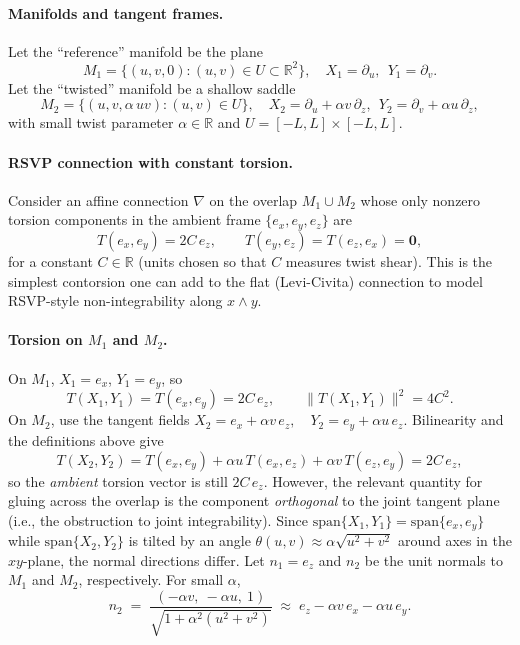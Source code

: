 \documentclass[a4paper,11pt]{article}
\begin{document}
\paragraph{Manifolds and tangent frames.}
Let the ``reference'' manifold be the plane
\[
M_1=\{(u,v,0): (u,v)\in U\subset\mathbb{R}^2\},\quad
X_1=\partial_u,\ \ Y_1=\partial_v.
\]
Let the ``twisted'' manifold be a shallow saddle
\[
M_2=\{(u,v,\alpha\,uv): (u,v)\in U\},\quad
X_2=\partial_u+\alpha v\,\partial_z,\ \ Y_2=\partial_v+\alpha u\,\partial_z,
\]
with small twist parameter $\alpha\in\mathbb{R}$ and $U=[-L,L]\times[-L,L]$.

\paragraph{RSVP connection with constant torsion.}
Consider an affine connection $\nabla$ on the overlap $M_1\cup M_2$ whose only
nonzero torsion components in the ambient frame $\{e_x,e_y,e_z\}$ are
\[
T(e_x,e_y)=2C\,e_z,\qquad T(e_y,e_z)=T(e_z,e_x)=\mathbf{0},
\]
for a constant $C\in\mathbb{R}$ (units chosen so that $C$ measures twist
shear). This is the simplest contorsion one can add to the flat (Levi-Civita)
connection to model RSVP-style non-integrability along $x\wedge y$.

\paragraph{Torsion on $M_1$ and $M_2$.}
On $M_1$, $X_1=e_x$, $Y_1=e_y$, so
\[
T(X_1,Y_1)=T(e_x,e_y)=2C\,e_z,\qquad \|T(X_1,Y_1)\|^2=4C^2.
\]
On $M_2$, use the tangent fields
\(
X_2=e_x+\alpha v\,e_z,\quad Y_2=e_y+\alpha u\,e_z.
\)
Bilinearity and the definitions above give
\[
T(X_2,Y_2)=T(e_x,e_y)+\alpha u\,T(e_x,e_z)+\alpha v\,T(e_z,e_y)
=2C\,e_z,
\]
so the \emph{ambient} torsion vector is still $2C\,e_z$. However, the relevant
quantity for gluing across the overlap is the component \emph{orthogonal} to
the joint tangent plane (i.e., the obstruction to joint integrability). Since
$\mathrm{span}\{X_1,Y_1\}=\mathrm{span}\{e_x,e_y\}$ while
$\mathrm{span}\{X_2,Y_2\}$ is tilted by an angle
$\theta(u,v)\approx \alpha \sqrt{u^2+v^2}$ around axes in the $xy$-plane, the
normal directions differ. Let $n_1=e_z$ and $n_2$ be the unit normals to $M_1$
and $M_2$, respectively. For small $\alpha$,
\[
n_2 \;=\; \frac{(-\alpha v,\ -\alpha u,\ 1)}{\sqrt{1+\alpha^2(u^2+v^2)}} 
\;\approx\; e_z - \alpha v\,e_x - \alpha u\,e_y.
\]
\end{document}
